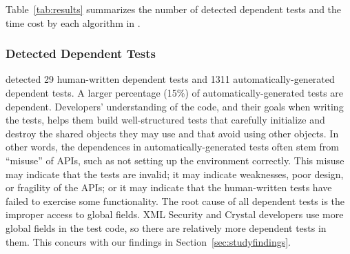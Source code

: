 Table~\ref{tab:results} summarizes the number of detected
dependent tests and the time cost by each algorithm
in \ourtool.

\subsubsection{Detected Dependent Tests}
\label{sec:detectedtests}


\ourtool detected 29 human-written dependent tests and 1311
automatically-generated dependent tests.  A larger percentage (15\%) of
automatically-generated tests are dependent.  Developers' understanding of
the code, and their goals when writing the tests, helps them build
well-structured tests that carefully initialize and destroy the shared
objects they may use and that avoid using other objects.  In other words,
the dependences in automatically-generated tests often stem from ``misuse''
of APIs, such as not setting up the environment correctly.  This misuse may
indicate that the tests are invalid; it may indicate weaknesses, poor
design, or fragility of the APIs; or it may indicate that the human-written
tests have failed to exercise some functionality.
The root cause of all dependent tests is the improper access to
global fields. XML Security and Crystal developers use more
global fields in the test code,
so there are relatively more dependent tests in them.
This concurs with our findings in Section~\ref{sec:studyfindings}.



